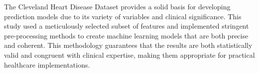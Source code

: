 The Cleveland Heart Disease Dataset provides a solid basis for developing prediction models due to its variety of variables and clinical significance. This study used a meticulously selected subset of features and implemented stringent pre-processing methods to create machine learning models that are both precise and coherent. This methodology guarantees that the results are both statistically valid and congruent with clinical expertise, making them appropriate for practical healthcare implementations.

